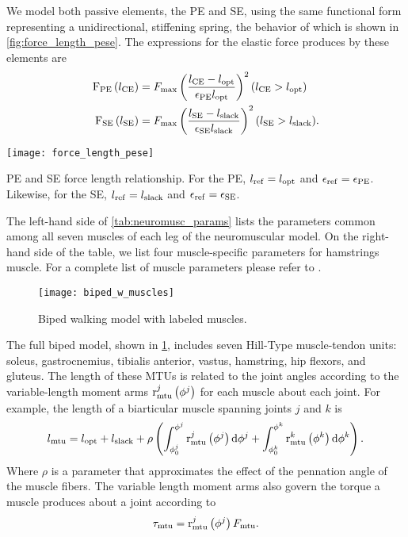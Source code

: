 We model both passive elements, the PE and SE, using the same functional form
representing a unidirectional, stiffening spring, the behavior of which is shown
in \cref{fig:force_length_pese}. The expressions for the elastic force produces
by these elements are
\begin{align}
    \func{F_\tn{PE}}{l_\tn{CE}} &= F_\tn{max} \left( \frac{l_\tn{CE} -
        l_\tn{opt}}{\epsilon_\tn{PE} l_\tn{opt}} \right)^2 
        (l_\tn{CE} > l_\tn{opt}) \label{eq:parallel_force_length}\\
    \func{F_\tn{SE}}{l_\tn{SE}} &= F_\tn{max} \left( \frac{l_\tn{SE} - 
        l_\tn{slack}}{\epsilon_\tn{SE} l_\tn{slack}} \right)^2 
        (l_\tn{SE} > l_\tn{slack}). \label{eq:series_force_length}
\end{align}
\begin{marginfigure}
    \centering
    \texttt{[image: force\_length\_pese]}
    \caption{PE and SE force length relationship. For the PE, $l_{\mathrm{ref}} = l_{\mathrm{opt}}$
    and $\epsilon_{\mathrm{ref}} = \epsilon_{\mathrm{PE}}$. Likewise, for the SE, $l_{\mathrm{ref}} =
    l_{\mathrm{slack}}$ and $\epsilon_{\mathrm{ref}} = \epsilon_{\mathrm{SE}}$.} 
    \label{fig:force_length_pese}
\end{marginfigure}

The left-hand side of \cref{tab:neuromusc_params} lists the parameters common
among all seven muscles of each leg of the neuromuscular model. On the
right-hand side of the table, we list four muscle-specific parameters for
hamstrings muscle. For a complete list of muscle parameters please refer
to \citet{song2015neural}. 

\begin{figure}[b]
    \centering
    \texttt{[image: biped\_w\_muscles]}
    \caption{Biped walking model with labeled muscles.} 
    \label{fig:biped_w_muscles}
\end{figure} 
The full biped model, shown in \cref{fig:biped_w_muscles}, includes
seven Hill-Type muscle-tendon units: soleus, gastrocnemius, tibialis anterior,
vastus, hamstring, hip flexors, and gluteus. The length of these MTUs is related
to the joint angles according to the variable-length moment arms
$\func{r}[\tn{mtu}][j]{\phi^j}$ for each muscle about each joint. For example,
the length of a biarticular muscle spanning joints $j$ and $k$ is
\begin{align}
    l_\tn{mtu} = l_\tn{opt} + l_\tn{slack} + \rho \left( \int_{\phi_0^j}^{\phi^j}
        \func{r}[\tn{mtu}][j]{\phi^j} \tn{d} \phi^j + \int_{\phi_0^k}^{\phi^k}
        \func{r}[\tn{mtu}][k]{\phi^k} \tn{d} \phi^k \right).
\end{align}
Where $\rho$ is a parameter that approximates the effect of the pennation angle 
of the muscle fibers. The variable length moment arms also govern the torque a
muscle produces about a joint according to
\begin{align}
    \tau_\tn{mtu} = \func{r}[\tn{mtu}][j]{\phi^j} F_\tn{mtu}.
    \label{eq:muscle_moment}
\end{align}

